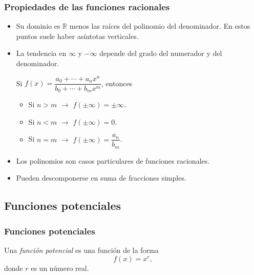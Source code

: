 \begin{frame}
\frametitle{Propiedades de las funciones racionales}
\begin{itemize}
\item Su dominio es $\mathbb{R}$ menos las raíces del polinomio del denominador. En estos puntos suele haber asíntotas
verticales.
\item La tendencia en $\infty$ y $-\infty$ depende del grado del numerador y del denominador. 

Si $f(x)=\dfrac{a_0+\cdots +a_nx^n}{b_0+\cdots+b_mx^m}$, entonces
\begin{itemize}
  \item Si $n>m$ $\rightarrow$ $f(\pm\infty)=\pm\infty$.
  \item Si $n<m$ $\rightarrow$ $f(\pm\infty)=0$.
  \item Si $n=m$ $\rightarrow$ $f(\pm\infty)=\dfrac{a_n}{b_m}$.
\end{itemize}
\item Los polinomios son casos particulares de funciones racionales. 
\item Pueden descomponerse en suma de fracciones simples.
\end{itemize}
\end{frame} 



\subsection{Funciones potenciales}
\begin{frame}
\frametitle{Funciones potenciales}
\begin{definicion}
Una \emph{función potencial} es una función de la forma
\[
f(x)=x^r,
\]
donde $r$ es un número real.
\end{definicion}
\begin{center}
\scalebox{1}{}
\end{center}
\end{frame} 


